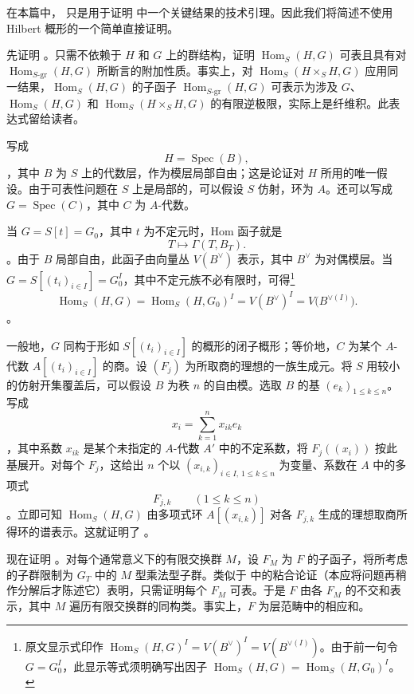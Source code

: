 在本篇中， 只是用于证明  中一个关键结果的技术引理。因此我们将简述不使用 Hilbert 概形的一个简单直接证明。

先证明 \textit{}。只需不依赖于 \(H\) 和 \(G\) 上的群结构，证明 \(\operatorname{Hom}_S(H,G)\) 可表且具有对 \(\operatorname{Hom}_{S\text{-}\mathrm{gr}}(H,G)\) 所断言的附加性质。事实上，对 \(\operatorname{Hom}_S(H\times_S H,G)\) 应用同一结果，\(\operatorname{Hom}_S(H,G)\) 的子函子 \(\operatorname{Hom}_{S\text{-}\mathrm{gr}}(H,G)\) 可表示为涉及 \(G\)、\(\operatorname{Hom}_S(H,G)\) 和 \(\operatorname{Hom}_S(H\times_S H,G)\) 的有限逆极限，实际上是纤维积。此表达式留给读者。

写成 \[
  H=\operatorname{Spec}(B),
\]，其中 \(B\) 为 \(S\) 上的代数层，作为模层局部自由；这是论证对 \(H\) 所用的唯一假设。由于可表性问题在 \(S\) 上是局部的，可以假设 \(S\) 仿射，环为 \(A\)。还可以写成 \(G=\operatorname{Spec}(C)\)，其中 \(C\) 为 \(A\)-代数。

当 \(G=S[t]=G_0\)，其中 \(t\) 为不定元时，Hom 函子就是 \[
  T\longmapsto\Gamma(T,B_T).
\]。由于 \(B\) 局部自由，此函子由向量丛 \(V(B^\vee)\) 表示，其中 \(B^\vee\) 为对偶模层。当 \(G=S[(t_i)_{i\in I}]=G_0^I\)，其中不定元族不必有限时，可得\footnote{原文显示式印作 \(\operatorname{Hom}_S(H,G)^I=V(B^\vee)^I=V(B^{\vee(I)})\)。由于前一句令 \(G=G_0^I\)，此显示等式须明确写出因子 \(\operatorname{Hom}_S(H,G)=\operatorname{Hom}_S(H,G_0)^I\)。}  \[
  \operatorname{Hom}_S(H,G)
  =\operatorname{Hom}_S(H,G_0)^I
  =V(B^\vee)^I
  =V\bigl(B^{\vee(I)}\bigr).
\]。

一般地，\(G\) 同构于形如 \(S[(t_i)_{i\in I}]\) 的概形的闭子概形；等价地，\(C\) 为某个 \(A\)-代数 \(A[(t_i)_{i\in I}]\) 的商。设 \((F_j)\) 为所取商的理想的一族生成元。将 \(S\) 用较小的仿射开集覆盖后，可以假设 \(B\) 为秩 \(n\) 的自由模。选取 \(B\) 的基 \((e_k)_{1\leq k\leq n}\)。写成 \[
  x_i=\sum_{k=1}^{n}x_{ik}e_k
\]，其中系数 \(x_{ik}\) 是某个未指定的 \(A\)-代数 \(A'\) 中的不定系数，将 \(F_j((x_i))\) 按此基展开。对每个 \(F_j\)，这给出 \(n\) 个以 \((x_{i,k})_{i\in I,\,1\leq k\leq n}\) 为变量、系数在 \(A\) 中的多项式 \[
  F_{j,k}\qquad(1\leq k\leq n)
\]。立即可知 \(\operatorname{Hom}_S(H,G)\) 由多项式环 \(A[(x_{i,k})]\) 对各 \(F_{j,k}\) 生成的理想取商所得环的谱表示。这就证明了 \textit{}。

现在证明 \textit{}。对每个通常意义下的有限交换群 \(M\)，设 \(F_M\) 为 \(F\) 的子函子，将所考虑的子群限制为 \(G_T\) 中的 \(M\) 型乘法型子群。类似于  中的粘合论证（本应将问题再稍作分解后才陈述它）表明，只需证明每个 \(F_M\) 可表。于是 \(F\) 由各 \(F_M\) 的不交和表示，其中 \(M\) 遍历有限交换群的同构类。事实上，\(F\) 为层范畴中的相应和。

